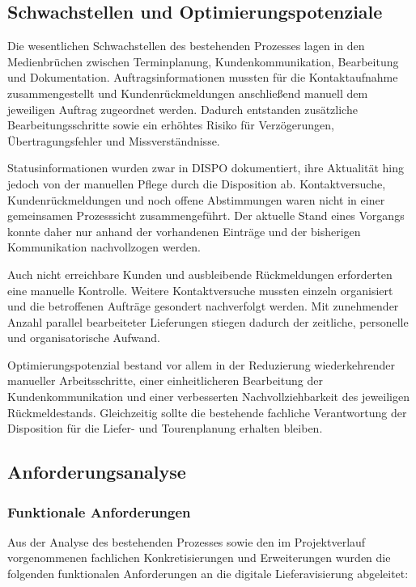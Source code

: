 \subsection{Schwachstellen und Optimierungspotenziale}

Die wesentlichen Schwachstellen des bestehenden Prozesses lagen
in den Medienbrüchen zwischen Terminplanung,
Kundenkommunikation, Bearbeitung und Dokumentation.
Auftragsinformationen mussten für die Kontaktaufnahme
zusammengestellt und Kundenrückmeldungen anschließend manuell
dem jeweiligen Auftrag zugeordnet werden. Dadurch entstanden
zusätzliche Bearbeitungsschritte sowie ein erhöhtes Risiko für
Verzögerungen, Übertragungsfehler und Missverständnisse.

Statusinformationen wurden zwar in DISPO dokumentiert,
ihre Aktualität hing jedoch von der manuellen Pflege durch die
Disposition ab. Kontaktversuche, Kundenrückmeldungen und noch
offene Abstimmungen waren nicht in einer gemeinsamen
Prozesssicht zusammengeführt. Der aktuelle Stand eines Vorgangs
konnte daher nur anhand der vorhandenen Einträge und der
bisherigen Kommunikation nachvollzogen werden.

Auch nicht erreichbare Kunden und ausbleibende Rückmeldungen
erforderten eine manuelle Kontrolle. Weitere Kontaktversuche
mussten einzeln organisiert und die betroffenen Aufträge
gesondert nachverfolgt werden. Mit zunehmender Anzahl parallel
bearbeiteter Lieferungen stiegen dadurch der zeitliche,
personelle und organisatorische Aufwand.

Optimierungspotenzial bestand vor allem in der Reduzierung
wiederkehrender manueller Arbeitsschritte, einer einheitlicheren
Bearbeitung der Kundenkommunikation und einer verbesserten
Nachvollziehbarkeit des jeweiligen Rückmeldestands. Gleichzeitig
sollte die bestehende fachliche Verantwortung der Disposition
für die Liefer- und Tourenplanung erhalten bleiben.

\subsection{Anforderungsanalyse}

\subsubsection{Funktionale Anforderungen}

Aus der Analyse des bestehenden Prozesses sowie den im
Projektverlauf vorgenommenen fachlichen Konkretisierungen und
Erweiterungen wurden die folgenden funktionalen Anforderungen
an die digitale Lieferavisierung abgeleitet:

